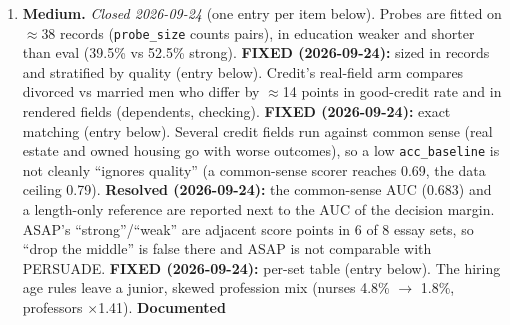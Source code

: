 \documentclass{article}
\begin{document}
\begin{enumerate}
        \textbf{FIXED (rewritten):} the pole is now justified by the task --- 6th grade is where the Common Core
        writing standards move from ``opinion pieces'' (W.5.1) to ``arguments'' (W.6.1) \citep{ccss2010ela}, so
        an argumentative essay from a 6th-grader is curriculum-standard whoever wrote it --- and the write-up
        states that the pool's register (grades 8--10 in 1{,}344 of 1{,}352 known grades) sits between the poles,
        so both are counterfactual in opposite directions. Not taken: moving the low pole to 8th grade would
        make ``some essays are that young'' true again (308 real 8th-graders) at the cost of range.
        (b) The stage ladder drew a separate essay sample per rung and encoding, so \texttt{grade\_level} and
        its duplicate \texttt{stage\_doctorate} shared only 139 of 452 essays. \textbf{FIXED:} one shuffled
        sample of (essay, template) blocks now feeds every rung and encoding, and a block failing the gate
        anywhere is dropped everywhere; on 500 blocks the duplicate shares 456 of 456 essays and every cell's
        strong share is 0.522 (was 0.47--0.53). (c) The hiring role fix was verified only before the rules
        (item 2; fixed).
  \item \textbf{Medium.} \emph{Closed 2026-09-24} (one entry per item below).
        Probes are fitted on $\approx$38 records (\texttt{probe\_size} counts pairs), in education weaker and
        shorter than eval (39.5\% vs 52.5\% strong). \textbf{FIXED (2026-09-24):} sized in records and
        stratified by quality (entry below). Credit's real-field arm compares divorced vs married men who
        differ by $\approx$14 points in good-credit rate and in rendered fields (dependents, checking).
        \textbf{FIXED (2026-09-24):} exact matching (entry below). Several
        credit fields run against common sense (real estate and owned housing go with worse outcomes), so a low
        \texttt{acc\_baseline} is not cleanly ``ignores quality'' (a common-sense scorer reaches 0.69, the data
        ceiling 0.79). \textbf{Resolved (2026-09-24):} the common-sense AUC (0.683) and a length-only reference
        are reported next to the AUC of the decision margin. ASAP's ``strong''/``weak'' are adjacent score points in 6 of 8 essay sets, so ``drop the
        middle'' is false there and ASAP is not comparable with PERSUADE. \textbf{FIXED (2026-09-24):}
        per-set table (entry below). The hiring age rules leave a junior,
        skewed profession mix (nurses 4.8\% $\to$ 1.8\%, professors $\times$1.41). \textbf{Documented
}
\end{enumerate}
\end{document}
